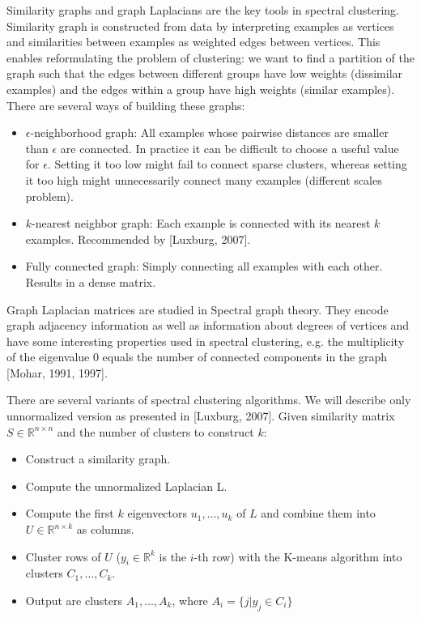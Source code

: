 \documentclass[conference]{IEEEtran}
\begin{document}
Similarity graphs and graph Laplacians are the key tools in spectral clustering.
Similarity graph is constructed from data by interpreting examples as vertices and similarities
between examples as weighted edges between vertices. This enables reformulating the problem
of clustering: we want to find a partition of the graph such that the edges between different groups
have low weights (dissimilar examples) and the edges within a group have high weights (similar examples).
There are several ways of building these graphs:
\begin{itemize}
    \item $\epsilon$-neighborhood graph: All examples whose pairwise distances are smaller than $\epsilon$
    are connected. In practice it can be difficult to choose a useful value for $\epsilon$. Setting it too
    low might fail to connect sparse clusters, whereas setting it too high might unnecessarily connect many
    examples (different scales problem).
    \item $k$-nearest neighbor graph: Each example is connected with its nearest $k$ examples. Recommended
    by [Luxburg, 2007].
    \item Fully connected graph: Simply connecting all examples with each other. Results in a dense matrix.
\end{itemize}

Graph Laplacian matrices are studied in Spectral graph theory. They encode graph adjacency information
as well as information about degrees of vertices and have some interesting properties used in spectral
clustering, e.g. the multiplicity of the eigenvalue 0 equals the number of connected components in the graph
[Mohar, 1991, 1997].

There are several variants of spectral clustering algorithms. We will describe only unnormalized version
as presented in [Luxburg, 2007]. Given similarity matrix $S \in \mathbb{R}^{n \times n}$ and the number
of clusters to construct $k$:

\begin{itemize}
    \item Construct a similarity graph.
    \item Compute the unnormalized Laplacian L.
    \item Compute the first $k$ eigenvectors $u_1, \dots, u_k$ of $L$ and combine them into
    $U \in \mathbb{R}^{n \times k}$ as columns.
    \item Cluster rows of $U$ ($y_i \in \mathbb{R}^k$ is the $i$-th row) with the K-means algorithm
    into clusters $C_1, \dots, C_k$.
    \item Output are clusters $A_1, \dots, A_k$, where $A_i = \{ j|y_j \in C_i \}$
\end{itemize}
\end{document}
